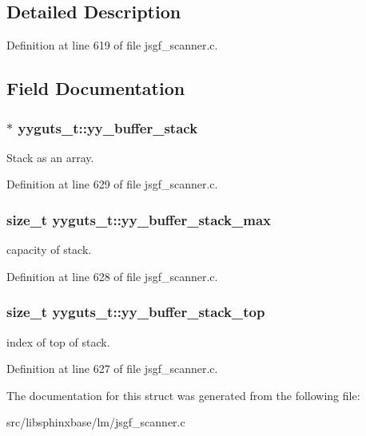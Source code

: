 \subsection{Detailed Description}


Definition at line 619 of file jsgf\-\_\-scanner.\-c.



\subsection{Field Documentation}
\subsubsection[{yy\-\_\-buffer\-\_\-stack}]{$\ast$ yyguts\-\_\-t\-::yy\-\_\-buffer\-\_\-stack}\label{structyyguts__t_ad0b9d576189d518a4482f20ed9b2a416}


Stack as an array. 



Definition at line 629 of file jsgf\-\_\-scanner.\-c.

\subsubsection[{yy\-\_\-buffer\-\_\-stack\-\_\-max}]{\setlength{\rightskip}{0pt plus 5cm}size\-\_\-t yyguts\-\_\-t\-::yy\-\_\-buffer\-\_\-stack\-\_\-max}\label{structyyguts__t_a4435bb91e87f9988b096afc21386289a}


capacity of stack. 



Definition at line 628 of file jsgf\-\_\-scanner.\-c.

\subsubsection[{yy\-\_\-buffer\-\_\-stack\-\_\-top}]{\setlength{\rightskip}{0pt plus 5cm}size\-\_\-t yyguts\-\_\-t\-::yy\-\_\-buffer\-\_\-stack\-\_\-top}\label{structyyguts__t_af92507d904af2fcd4509acde654a9850}


index of top of stack. 



Definition at line 627 of file jsgf\-\_\-scanner.\-c.



The documentation for this struct was generated from the following file\-:\begin{DoxyCompactItemize}
\item 
src/libsphinxbase/lm/jsgf\-\_\-scanner.\-c\end{DoxyCompactItemize}
